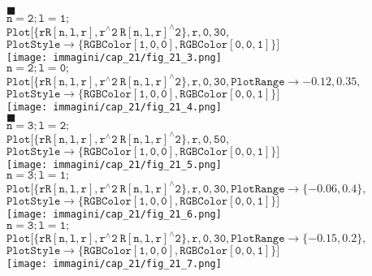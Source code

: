 $\blacksquare$ \textbf{}\\
$\pmb{\mathtt{n=2;l=1;}}$\\
$\pmb{\mathtt{Plot[\{r R[n,l,r], r^{\wedge}2\ R[n,l,r]^{\wedge}2\},{r,0,30},}}$\\
\hspace*{1cm}$\pmb{\mathtt{PlotStyle\rightarrow \{ RGBColor[1,0,0],RGBColor[0,0,1]\}]}}$\\
\texttt{[image: immagini/cap\_21/fig\_21\_3.png]}\\
\noindent$\pmb{\mathtt{n=2;l=0;}}$\\
$\pmb{\mathtt{Plot[\{r R[n,l,r], r^{\wedge}2\ R[n,l,r]^{\wedge}2\},{r,0,30},PlotRange \rightarrow {-0.12, 0.35},}}$\\
\hspace*{1cm}$\pmb{\mathtt{PlotStyle\rightarrow \{ RGBColor[1,0,0],RGBColor[0,0,1]\}]}}$\\
\texttt{[image: immagini/cap\_21/fig\_21\_4.png]}\\
$\blacksquare$ \textbf{}\\
$\pmb{\mathtt{n=3;l=2;}}$\\
$\pmb{\mathtt{Plot[\{r R[n,l,r], r^{\wedge}2\ R[n,l,r]^{\wedge}2\},{r,0,50},}}$\\
\hspace*{1cm}$\pmb{\mathtt{PlotStyle\rightarrow \{ RGBColor[1,0,0],RGBColor[0,0,1]\}]}}$\\
\texttt{[image: immagini/cap\_21/fig\_21\_5.png]}\\
\noindent$\pmb{\mathtt{n=3;l=1;}}$\\
$\pmb{\mathtt{Plot[\{r R[n,l,r], r^{\wedge}2\ R[n,l,r]^{\wedge}2\},{r,0,30},PlotRange\rightarrow\{-0.06, 0.4\},}}$\\
\hspace*{1cm}$\pmb{\mathtt{PlotStyle\rightarrow \{ RGBColor[1,0,0],RGBColor[0,0,1]\}]}}$\\
\texttt{[image: immagini/cap\_21/fig\_21\_6.png]}\\
\noindent$\pmb{\mathtt{n=3;l=1;}}$\\
$\pmb{\mathtt{Plot[\{r R[n,l,r], r^{\wedge}2\ R[n,l,r]^{\wedge}2\},{r,0,30},PlotRange\rightarrow\{-0.15, 0.2\},}}$\\
\hspace*{1cm}$\pmb{\mathtt{PlotStyle\rightarrow \{ RGBColor[1,0,0],RGBColor[0,0,1]\}]}}$\\
\texttt{[image: immagini/cap\_21/fig\_21\_7.png]}
